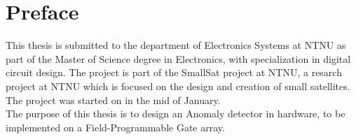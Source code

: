 \newpage
\chapter*{Preface}




This thesis is submitted to the department of Electronics Systems at NTNU as part of the Master of Science degree in Electronics, with specialization in digital circuit design. The project is part of the SmallSat project at NTNU, a resarch project at NTNU which is focused on the design and creation of small satellites. The project was started on in the mid of January. 
\\

The purpose of this thesis is to design an Anomaly detector in hardware, to be implemented on a Field-Programmable Gate array. 
\\


